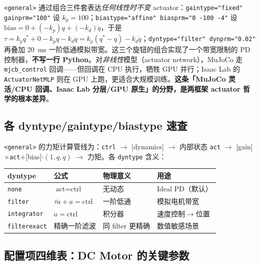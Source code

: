\begin{insight}\label{ins:rlmc-act-general}
\verb|<general>| 通过组合三件套表达\emph{任何线性时不变} actuator：\verb|gaintype="fixed" gainprm="100"| 设 $k_p=100$；\verb|biastype="affine" biasprm="0 -100 -4"| 设 $\text{bias}=0+(-k_p)q+(-k_d)\dot q$，于是 $\tau=k_p q^* + 0 - k_p q - k_d\dot q = k_p(q^*-q)-k_d\dot q$；\verb|dyntype="filter" dynprm="0.02"| 再叠加 20~ms 一阶低通模拟带宽。这三个旋钮的组合实现了一个带宽限制的 PD 控制器，\textbf{不写一行 Python}。对\emph{非线性}模型（actuator network），MuJoCo 走 \verb|mjcb_control| 回调——但回调在 CPU 执行，牺牲 GPU 并行；Isaac Lab 的 \verb|ActuatorNetMLP| 则在 GPU 上跑，更适合大规模训练。\textbf{这条「MuJoCo 灵活/CPU 回调、Isaac Lab 分层/GPU 原生」的分野，是两框架 actuator 哲学的根本差异}。
\end{insight}

\subsection{各 dyntype/gaintype/biastype 速查}
\label{sec:rlmc-act-general-table}

\verb|<general>| 的力矩计算管线为：\verb|ctrl| $\to$ [dynamics] $\to$ 内部状态 \verb|act| $\to$ [gain]$\times$\verb|act|$+$[bias]$\cdot(1,q,\dot q)$ $\to$ 力矩。各 \verb|dyntype| 含义：

\begin{center}
\small
\begin{tabular}{@{}lllp{3.2cm}@{}}
\toprule
dyntype & 公式 & 物理意义 & 用途 \\
\midrule
\verb|none| & $\text{act}=\text{ctrl}$ & 无动态 & Ideal PD（默认） \\
\verb|filter| & $\tau\dot a + a = \text{ctrl}$ & 一阶低通 & 模拟电机带宽 \\
\verb|integrator| & $\dot a = \text{ctrl}$ & 积分器 & 速度控制$\to$位置 \\
\verb|filterexact| & 精确一阶滤波 & 同 filter 更精确 & 数值敏感场景 \\
\bottomrule
\end{tabular}
\end{center}

\subsection{配置项四维表：DC Motor 的关键参数}
\label{sec:rlmc-act-cfg4d}

